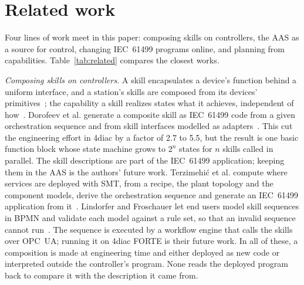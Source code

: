 %

\section{Related work}
\label{sec:related}

Four lines of work meet in this paper: composing skills on controllers, the AAS as a source for
control, changing IEC~61499 programs online, and planning from capabilities. Table~\ref{tab:related}
compares the closest works.

\emph{Composing skills on controllers.} A skill encapsulates a device's function behind a uniform
interface, and a station's skills are composed from its devices'
primitives~\cite{schou2018skill}; the capability a skill realizes states what it achieves,
independent of how~\cite{koecher2023reference}. Dorofeev et al. generate a composite skill as
IEC~61499 code from a given orchestration sequence and from skill interfaces modelled as
adapters~\cite{dorofeev2021orchestrator}. This cut the engineering effort in 4diac by a factor of 2.7
to 5.5, but the result is one basic function block whose state machine grows to $2^n$ states for $n$
skills called in parallel. The skill descriptions are part of the IEC~61499 application; keeping them
in the AAS is the authors' future work. Terzimehić et al. compute where services are deployed with
SMT, from a recipe, the plant topology and the component models, derive the orchestration sequence
and generate an IEC~61499 application from it~\cite{terzimehic2021service}. Lindorfer and Froschauer
let end users model skill sequences in BPMN and validate each model against a rule set, so that an
invalid sequence cannot run~\cite{lindorfer2019user}. The sequence is executed by a workflow engine
that calls the skills over OPC~UA; running it on 4diac FORTE is their future work. In all of these, a
composition is made at engineering time and either deployed as new code or interpreted outside the
controller's program. None reads the deployed program back to compare it with the description it
came from.

